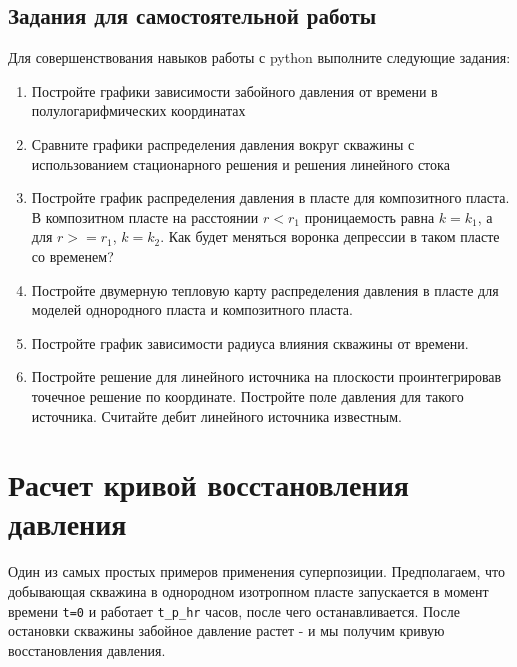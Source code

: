 \documentclass[
  russian,
  letterpaper,
  DIV=11,
  numbers=noendperiod,
  oneside]{scrartcl}
\providecommand{\tightlist}{%
  \setlength{\itemsep}{0pt}\setlength{\parskip}{0pt}}
\begin{document}
\subsection{Задания для самостоятельной
работы}\label{ux437ux430ux434ux430ux43dux438ux44f-ux434ux43bux44f-ux441ux430ux43cux43eux441ux442ux43eux44fux442ux435ux43bux44cux43dux43eux439-ux440ux430ux431ux43eux442ux44b-1}

Для совершенствования навыков работы с python выполните следующие
задания:

\begin{enumerate}
\def\labelenumi{\arabic{enumi}.}
\tightlist
\item
  Постройте графики зависимости забойного давления от времени в
  полулогарифмических координатах
\item
  Сравните графики распределения давления вокруг скважины с
  использованием стационарного решения и решения линейного стока
\item
  Постройте график распределения давления в пласте для композитного
  пласта. В композитном пласте на расстоянии \(r<r_1\) проницаемость
  равна \(k=k_1\), а для \(r>=r_1\), \(k=k_2\). Как будет меняться
  воронка депрессии в таком пласте со временем?
\item
  Постройте двумерную тепловую карту распределения давления в пласте для
  моделей однородного пласта и композитного пласта.
\item
  Постройте график зависимости радиуса влияния скважины от времени.
\item
  Постройте решение для линейного источника на плоскости проинтегрировав
  точечное решение по координате. Постройте поле давления для такого
  источника. Считайте дебит линейного источника известным.
\end{enumerate}

\section{Расчет кривой восстановления
давления}\label{ux440ux430ux441ux447ux435ux442-ux43aux440ux438ux432ux43eux439-ux432ux43eux441ux441ux442ux430ux43dux43eux432ux43bux435ux43dux438ux44f-ux434ux430ux432ux43bux435ux43dux438ux44f}

Один из самых простых примеров применения суперпозиции. Предполагаем,
что добывающая скважина в однородном изотропном пласте запускается в
момент времени \texttt{t=0} и работает \texttt{t\_p\_hr} часов, после
чего останавливается. После остановки скважины забойное давление растет
- и мы получим кривую восстановления давления.
\end{document}
